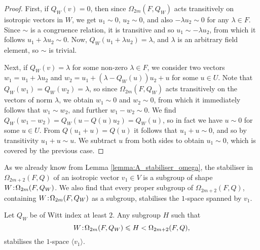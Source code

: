 \begin{proof}
    First, if $Q_W(v) = 0$, then since $\Omega_{2m}(F,Q_W)$ acts transitively on isotropic
    vectors in $W$, we get $u_1 \sim 0$, $u_2 \sim 0$, and also $-\lambda u_2 \sim 0$ for any 
    $\lambda \in F$. Since $\sim$ is a congruence relation, it is transitive and so
    $u_1 \sim -\lambda u_2$, from which it follows $u_1 + \lambda u_2 \sim 0$. Now, 
    $Q_W(u_1 + \lambda u_2) = \lambda$, and $\lambda$ is an arbitrary field element,
    so $\sim$ is trivial.
    
    Next, if $Q_W(v) = \lambda$ for some non-zero $\lambda \in F$, we consider two vectors
    $w_1 = u_1 + \lambda u_2$ and $w_2 = u_1 + (\lambda - Q_W(u))u_2 + u$ for some $u \in U$. 
    Note that $Q_W(w_1) = Q_W(w_2) = \lambda$, so since $\Omega_{2m}(F,Q_W)$
    acts transitively on the vectors of norm $\lambda$, we obtain
    $w_1 \sim 0$ and $w_2 \sim 0$, from which it immediately follows that 
    $w_1 \sim w_2$, and further $w_1 - w_2 \sim 0$. 
    We find $Q_W(w_1 - w_2) = Q_W(u - Q(u)u_2) = Q_W(u)$, so in fact we have
    $u \sim 0$ for some $u \in U$. From $Q(u_1+u) = Q(u)$ it follows that 
    $u_1 + u \sim 0$, and so by transitivity $u_1+u \sim u$. We subtract $u$ from both
    sides to obtain $u_1 \sim 0$, which is covered by the previous case. 
\end{proof}

As we already know from Lemma \ref{lemma:A_stabiliser_omega}, the stabiliser in $\Omega_{2m+2}(F,Q)$
of an isotropic vector $v_1 \in V$ is a subgroup of shape $W\mathord{{\;\!{:}\;\!}}\Omega_{2m}(F,Q_W)$. We also find that
every proper 
subgroup of $\Omega_{2m+2}(F,Q)$, containing $W\mathord{{\;\!{:}\;\!}}\Omega_{2m}(F,Q_W)$ as a subgroup, stabilises 
the $1$-space spanned by $v_1$.

\begin{theorem}
	\label{theorem:A_space_stab}
	Let $Q_W$ be of Witt index at least $2$. Any subgroup $H$ such that
	\begin{equation}
		W\mathord{{\;\!{:}\;\!}}\Omega_{2m}(F,Q_W) \leqslant H < \Omega_{2m+2}(F,Q),
	\end{equation}
	stabilises the $1$-space $\langle v_1 \rangle$. 
\end{theorem}

